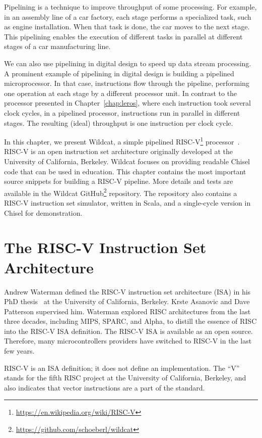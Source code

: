 \documentclass[%
    10pt,
    headinclude, footinclude=false,
    openright, %
    notitlepage,
    cleardoublepage=empty,
    headsepline,
    numbers=noenddot,
    bibliography=totoc, index=totoc,
    ]{scrbook}
\newcommand{\myref}[2]{\href{#1}{#2}}
\renewcommand{\myref}[2]{{#2}{\footnote{\url{#1}}}}
\begin{document}
Pipelining is a technique to improve throughput of some processing.
For example, in an assembly line of a car factory, each stage performs a specialized task,
such as engine installation. When that task is done, the car moves to the next stage.
This pipelining enables the execution of different tasks in parallel at different stages of a car
manufacturing line.

We can also use pipelining in digital design to speed up data stream processing.
A prominent example of pipelining in digital design is building a pipelined microprocessor.
In that case, instructions flow through the pipeline, performing one operation at each stage
by a different processor unit. In contrast to the processor presented in Chapter~\ref{chap:leros},
where each instruction took several clock cycles, in a pipelined processor, instructions
run in parallel in different stages. The resulting (ideal) throughput is one instruction per clock cycle.

In this chapter, we present Wildcat, a simple pipelined
\myref{https://en.wikipedia.org/wiki/RISC-V}{RISC-V}
processor~\cite{wildcat:2024}.
RISC-V is an open instruction set architecture originally developed at the University of
California, Berkeley.
Wildcat focuses on providing readable Chisel code that can be used in education.
This chapter contains the most important source snippets for building a RISC-V pipeline.
More details and tests are available in the \myref{https://github.com/schoeberl/wildcat}{Wildcat GitHub}
repository. The repository also contains a RISC-V instruction set simulator, written in Scala, and a single-cycle version in Chisel for demonstration.

\section{The RISC-V Instruction Set Architecture}

Andrew Waterman defined the RISC-V instruction set architecture (ISA) in his
PhD thesis~\cite{Waterman:EECS-2016-1} at the University of California, Berkeley.
Krste Asanovic and Dave Patterson supervised him.
Waterman explored RISC architectures from the last three decades, including MIPS, SPARC, and Alpha,
to distill the essence of RISC into the RISC-V ISA definition.
The RISC-V ISA is available as an open source. Therefore, many microcontrollers
providers have switched to RISC-V in the last few years.

RISC-V is an ISA definition; it does not define an implementation.
The ``V'' stands for the fifth RISC project at the University of California, Berkeley, and also indicates that vector instructions are a part of the standard.
\end{document}
